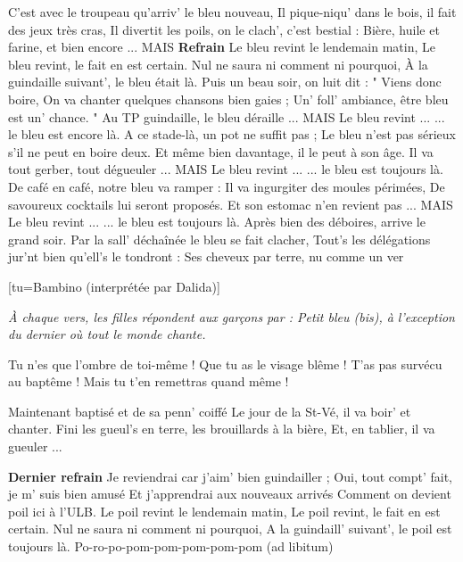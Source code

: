 \footnotemark
[itile={Bleu revint, le}, tu={Grand-Papa Nicolas}]


\beginverse
C'est avec le troupeau qu'arriv' le bleu nouveau,
Il pique-niqu' dans le bois, il fait des jeux très cras,
Il divertit les poils, on le clach', c'est bestial :
Bière, huile et farine, et bien encore ... MAIS
\endverse
\beginchorus
\textbf{Refrain}
Le bleu revint le lendemain matin,
Le bleu revint, le fait en est certain.
Nul ne saura ni comment ni pourquoi,
À la guindaille suivant', le bleu était là.
\endchorus
\beginverse
Puis un beau soir, on luit dit : " Viens donc boire,
On va chanter quelques chansons bien gaies ;
Un' foll' ambiance, être bleu est un' chance. "
Au TP guindaille, le bleu déraille ... MAIS
\endverse
\beginchorus
Le bleu revint ... ... le bleu est encore là.
\endchorus
\beginverse
A ce stade-là, un pot ne suffit pas ;
Le bleu n'est pas sérieux s'il ne peut en boire deux.
Et même bien davantage, il le peut à son âge.
Il va tout gerber, tout dégueuler ... MAIS
\endverse
\beginchorus
Le bleu revint ... ... le bleu est toujours là.
\endchorus
\beginverse
De café en café, notre bleu va ramper :
Il va ingurgiter des moules périmées,
De savoureux cocktails lui seront proposés.
Et son estomac n'en revient pas ... MAIS
\endverse
\beginchorus
Le bleu revint ... ... le bleu est toujours là.
\endchorus
Après bien des déboires, arrive le grand soir.
Par la sall' déchaînée le bleu se fait clacher,
Tout's les délégations jur'nt bien qu'ell's le tondront :
Ses cheveux par terre, nu comme un ver
\endverse

\beginverse

[tu={Bambino (interprétée par Dalida)}]

\emph{À chaque vers, les filles répondent aux garçons par : Petit bleu (bis), à l'exception du dernier où tout le monde chante.}

Tu n'es que l'ombre de toi-même !
Que tu as le visage blême !
T'as pas survécu au baptême !
Mais tu t'en remettras quand même !
\endverse

\beginverse
[tu={Grand-Papa Nicolas}]

Maintenant baptisé et de sa penn' coiffé
Le jour de la St-Vé, il va boir' et chanter.
Fini les gueul's en terre, les brouillards à la bière,
Et, en tablier, il va gueuler ...
\endverse

\beginchorus
\textbf{Dernier refrain}
Je reviendrai car j'aim' bien guindailler ;
Oui, tout compt' fait, je m' suis bien amusé
Et j'apprendrai aux nouveaux arrivés
Comment on devient poil ici à l'ULB.
Le poil revint le lendemain matin,
Le poil revint, le fait en est certain.
Nul ne saura ni comment ni pourquoi,
A la guindaill' suivant', le poil est toujours là.
Po-ro-po-pom-pom-pom-pom-pom (ad libitum)
\endchorus
\endsong


